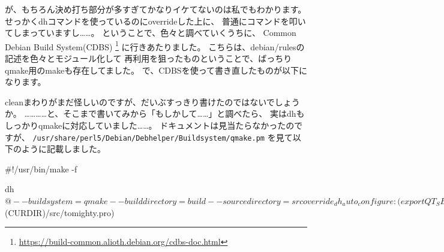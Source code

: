\documentclass[mingoth,a4paper]{jsarticle}
\begin{document}
が、もちろん決め打ち部分が多すぎてかなりイケてないのは私でもわかります。
せっかくdhコマンドを使っているのにoverrideした上に、
普通にコマンドを叩いてしまっていますし……。
ということで、色々と調べていくうちに、
Common Debian Build System(CDBS)%
\footnote{\url{https://build-common.alioth.debian.org/cdbs-doc.html}}
に行きあたりました。
こちらは、debian/rulesの記述を色々とモジュール化して
再利用を狙ったものということで、ばっちりqmake用のmakeも存在してました。
で、CDBSを使って書き直したものが以下になります。
cleanまわりがまだ怪しいのですが、だいぶすっきり書けたのではないでしょうか。
%
…………と、そこまで書いてみから「もしかして……」と調べたら、
実はdhもしっかりqmakeに対応していました……。
ドキュメントは見当たらなかったのですが、
\verb|/usr/share/perl5/Debian/Debhelper/Buildsystem/qmake.pm|
を見て以下のように記載しました。

\begin{commandline}
#!/usr/bin/make -f

	dh $@ --buildsystem=qmake --builddirectory=build --sourcedirectory=src

override_dh_auto_configure:
	(export QT_SELECT=qt5; dh_auto_configure -- $(CURDIR)/src/tomighty.pro)
\end{commandline}
\end{document}
